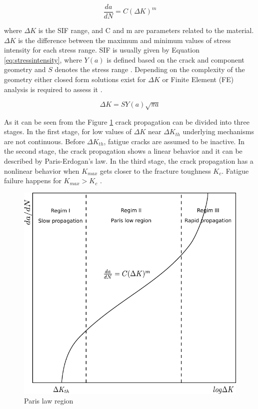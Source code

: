 \begin{equation}
 \frac{da}{dN}= C(\Delta K)^m
 \label{eq:paris}
\end{equation}

\noindent
where $\Delta K$ is the SIF range, and C and m are parameters related to the material. $\Delta K$ is the difference between the maximum and minimum values of stress intensity 
for each stress range. SIF is usually given by Equation \ref{eq:stressintensity}, where $Y(a)$ is defined based on the crack and component geometry and $S$ denotes the stress 
range \citep{broek1986, RITCHIE1973639}. Depending on the complexity of the geometry either closed form solutions exist for $\Delta K$ or Finite Element (FE) analysis is required to assess it
\citep{LI201921, QIAN19921003}. 

\begin{equation}
 \Delta K= SY(a)\sqrt{\pi a}
 \label{eq:stressintensity}
\end{equation}

As it can be seen from the Figure \ref{fig:fracture} crack propagation can be divided into three stages. In the first stage, for low values of $\Delta K$ near $\Delta K_{th}$ underlying mechanisms
are not continuous. Before $\Delta K_{th}$, fatigue cracks are assumed to be inactive. In the second stage, the crack propagation shows a linear behavior and it can 
be described by Paris-Erdogan's law. In the third stage, the crack propagation has a nonlinear behavior when $K_{max}$ gets closer to the fracture toughness $K_c$. Fatigue failure happens for 
$K_{max} > K_c$ \citep{Ritchie1999}. 

\begin{figure}[hbt!]
\centering
  \includegraphics[width=0.6\linewidth]{figures/fig-ch1/fracture.pdf}
  \caption{Paris law region}
  \label{fig:fracture}
\end{figure}

